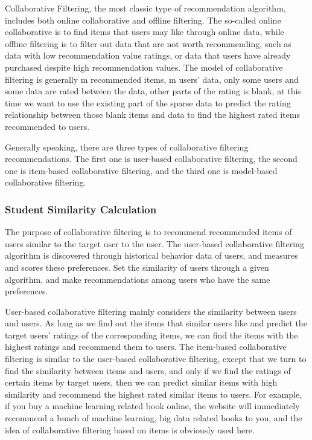 Collaborative Filtering, the most classic type of recommendation algorithm, includes both online collaborative and offline filtering. The so-called online collaborative is to find items that users may like through online data, while offline filtering is to filter out data that are not worth recommending, such as data with low recommendation value ratings, or data that users have already purchased despite high recommendation values. The model of collaborative filtering is generally m recommended items, m users' data, only some users and some data are rated between the data, other parts of the rating is blank, at this time we want to use the existing part of the sparse data to predict the rating relationship between those blank items and data to find the highest rated items recommended to users.

Generally speaking, there are three types of collaborative filtering recommendations. The first one is user-based collaborative filtering, the second one is item-based collaborative filtering, and the third one is model-based collaborative filtering.


\subsubsection{Student Similarity Calculation}
The purpose of collaborative filtering is to recommend recommended items of users similar to the target user to the user. The user-based collaborative filtering algorithm is discovered through historical behavior data of users, and measures and scores these preferences. Set the similarity of users through a given algorithm, and make recommendations among users who have the same preferences.

User-based collaborative filtering mainly considers the similarity between users and users. As long as we find out the items that similar users like and predict the target users' ratings of the corresponding items, we can find the items with the highest ratings and recommend them to users. The item-based collaborative filtering is similar to the user-based collaborative filtering, except that we turn to find the similarity between items and users, and only if we find the ratings of certain items by target users, then we can predict similar items with high similarity and recommend the highest rated similar items to users. For example, if you buy a machine learning related book online, the website will immediately recommend a bunch of machine learning, big data related books to you, and the idea of collaborative filtering based on items is obviously used here.

